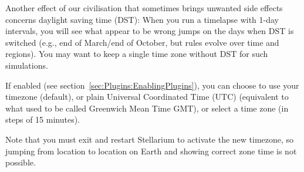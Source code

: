 Another effect of our civilisation that sometimes brings unwanted side
effects concerns daylight saving time (DST): When you run a timelapse
with 1-day intervals, you will see what appear to be wrong jumps on
the days when DST is switched (e.g., end of March/end of October, but
rules evolve over time and regions). You may want to keep a single
time zone without DST for such simulations.


If enabled (see section~\ref{sec:Plugins:EnablingPlugins}), you can
choose to use your timezone (default), or plain Universal Coordinated
Time (UTC) (equivalent to what used to be called Greenwich Mean Time
GMT), or select a time zone (in steps of 15 minutes). 

Note that you must exit and restart Stellarium to activate the new
timezone, so jumping from location to location on Earth and showing
correct zone time is not possible.




